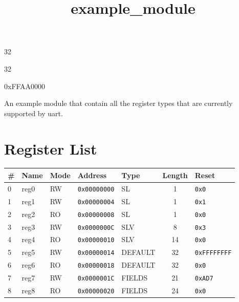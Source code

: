 \documentclass{article}
\title{example{\_}module}
\author{}
\date{}
\begin{document}
\maketitle

\begin{description}[leftmargin=!,labelwidth=\widthof{\bfseries Address width: }]
\item [Address width: ] 32
\item [Data width: ] 32
\item [Base address: ] 0xFFAA0000
\end{description}


An example module that contain all the register types that are currently supported by uart.

\section{Register List}

\begin{table}[h!]
  \begin{center}
    \label{tab:table1}
    \begin{tabularx}{\linewidth}{|l|X|l|l|l|c|l|}
      \hline
      \textbf{\#} & \textbf{Name} & \textbf{Mode} & \textbf{Address} & \textbf{Type} & \textbf{Length} &
      \textbf{Reset} \\
      \hline
      0 & reg0 & RW & \texttt{0x00000000} & SL & 1 & \texttt{0x0} \\
      \hline
      1 & reg1 & RW & \texttt{0x00000004} & SL & 1 & \texttt{0x1} \\
      \hline
      2 & reg2 & RO & \texttt{0x00000008} & SL & 1 & \texttt{0x0} \\
      \hline
      3 & reg3 & RW & \texttt{0x0000000C} & SLV & 8 & \texttt{0x3} \\
      \hline
      4 & reg4 & RO & \texttt{0x00000010} & SLV & 14 & \texttt{0x0} \\
      \hline
      5 & reg5 & RW & \texttt{0x00000014} & DEFAULT & 32 & \texttt{0xFFFFFFFF} \\
      \hline
      6 & reg6 & RO & \texttt{0x00000018} & DEFAULT & 32 & \texttt{0x0} \\
      \hline
      7 & reg7 & RW & \texttt{0x0000001C} & FIELDS & 21 & \texttt{0xAD7} \\
      \hline
      8 & reg8 & RO & \texttt{0x00000020} & FIELDS & 24 & \texttt{0x0} \\
      \hline
    \end{tabularx}
  \end{center}
\end{table}
\end{document}

